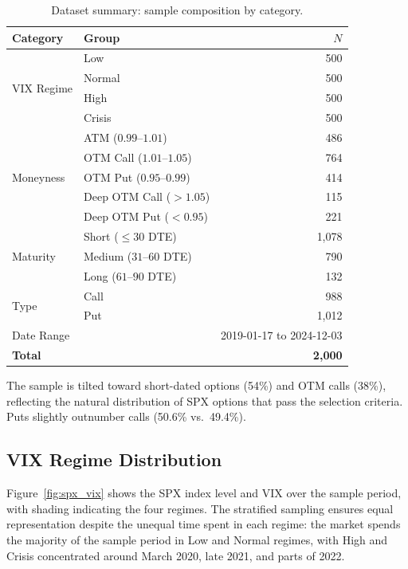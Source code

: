 \documentclass[12pt, letterpaper]{article}
\begin{document}
\begin{table}[H]
\centering
\caption{Dataset summary: sample composition by category.}
\label{tab:dataset_summary}
\begin{tabular}{llr}
\toprule
Category & Group & $N$ \\
\midrule
\multirow{4}{*}{VIX Regime}
    & Low     & 500 \\
    & Normal  & 500 \\
    & High    & 500 \\
    & Crisis  & 500 \\
\midrule
\multirow{5}{*}{Moneyness}
    & ATM ($0.99$--$1.01$)          & 486 \\
    & OTM Call ($1.01$--$1.05$)     & 764 \\
    & OTM Put ($0.95$--$0.99$)      & 414 \\
    & Deep OTM Call ($> 1.05$)      & 115 \\
    & Deep OTM Put ($< 0.95$)       & 221 \\
\midrule
\multirow{3}{*}{Maturity}
    & Short ($\leq 30$ DTE)   & 1,078 \\
    & Medium ($31$--$60$ DTE) & 790 \\
    & Long ($61$--$90$ DTE)   & 132 \\
\midrule
\multirow{2}{*}{Type}
    & Call & 988 \\
    & Put  & 1,012 \\
\midrule
\multicolumn{2}{l}{Date Range} & 2019-01-17 to 2024-12-03 \\
\multicolumn{2}{l}{\textbf{Total}} & \textbf{2,000} \\
\bottomrule
\end{tabular}
\end{table}

The sample is tilted toward short-dated options (54\%) and OTM calls (38\%), reflecting the natural distribution of SPX options that pass the selection criteria. Puts slightly outnumber calls (50.6\% vs.\ 49.4\%).

\subsection{VIX Regime Distribution}

Figure~\ref{fig:spx_vix} shows the SPX index level and VIX over the sample period, with shading indicating the four regimes. The stratified sampling ensures equal representation despite the unequal time spent in each regime: the market spends the majority of the sample period in Low and Normal regimes, with High and Crisis concentrated around March 2020, late 2021, and parts of 2022.
\end{document}
